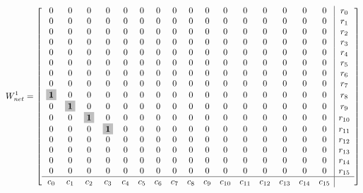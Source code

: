 \documentclass[11pt]{article}
\newenvironment{answerbox}%
  {\begin{mdframed}[linecolor=darkgray,%
                    roundcorner=10pt,innertopmargin=10pt,%
                    innerbottommargin=10pt,skipabove=12pt,skipbelow=12pt]}%
  {\end{mdframed}}
\newcommand{\bigmath}[1]{\colorbox{lightgray}{$\mathbf{#1}$}}
\begin{document}
\begin{itemize}
    \begin{answerbox}
$$
W_{net}^1 = \left[
\begin{array}{*{16}c|c}
0 & 0 & 0 & 0 & 0 & 0 & 0 & 0 & 0 & 0 & 0 & 0 & 0 & 0 & 0 & 0 & r_0 \\
0 & 0 & 0 & 0 & 0 & 0 & 0 & 0 & 0 & 0 & 0 & 0 & 0 & 0 & 0 & 0 & r_1 \\
0 & 0 & 0 & 0 & 0 & 0 & 0 & 0 & 0 & 0 & 0 & 0 & 0 & 0 & 0 & 0 & r_2 \\
0 & 0 & 0 & 0 & 0 & 0 & 0 & 0 & 0 & 0 & 0 & 0 & 0 & 0 & 0 & 0 & r_3 \\
0 & 0 & 0 & 0 & 0 & 0 & 0 & 0 & 0 & 0 & 0 & 0 & 0 & 0 & 0 & 0 & r_4 \\
0 & 0 & 0 & 0 & 0 & 0 & 0 & 0 & 0 & 0 & 0 & 0 & 0 & 0 & 0 & 0 & r_5 \\
0 & 0 & 0 & 0 & 0 & 0 & 0 & 0 & 0 & 0 & 0 & 0 & 0 & 0 & 0 & 0 & r_6 \\
0 & 0 & 0 & 0 & 0 & 0 & 0 & 0 & 0 & 0 & 0 & 0 & 0 & 0 & 0 & 0 & r_7 \\
\bigmath{1} & 0 & 0 & 0 & 0 & 0 & 0 & 0 & 0 & 0 & 0 & 0 & 0 & 0 & 0 & 0 & r_8 \\
0 & \bigmath{1} & 0 & 0 & 0 & 0 & 0 & 0 & 0 & 0 & 0 & 0 & 0 & 0 & 0 & 0 & r_9 \\
0 & 0 & \bigmath{1} & 0 & 0 & 0 & 0 & 0 & 0 & 0 & 0 & 0 & 0 & 0 & 0 & 0 & r_{10} \\
0 & 0 & 0 & \bigmath{1} & 0 & 0 & 0 & 0 & 0 & 0 & 0 & 0 & 0 & 0 & 0 & 0 & r_{11} \\
0 & 0 & 0 & 0 & 0 & 0 & 0 & 0 & 0 & 0 & 0 & 0 & 0 & 0 & 0 & 0 & r_{12} \\
0 & 0 & 0 & 0 & 0 & 0 & 0 & 0 & 0 & 0 & 0 & 0 & 0 & 0 & 0 & 0 & r_{13} \\
0 & 0 & 0 & 0 & 0 & 0 & 0 & 0 & 0 & 0 & 0 & 0 & 0 & 0 & 0 & 0 & r_{14} \\
0 & 0 & 0 & 0 & 0 & 0 & 0 & 0 & 0 & 0 & 0 & 0 & 0 & 0 & 0 & 0 & r_{15} \\
\hline
c_0 & c_1 & c_2 & c_3 & c_4 & c_5 & c_6 & c_7 & c_8 & c_9 & c_{10} & c_{11} & c_{12} & c_{13} & c_{14} & c_{15} &
\end{array}
\right]
$$


\end{answerbox}
\end{itemize}
\end{document}
